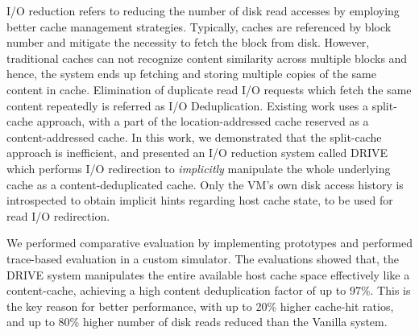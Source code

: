 
I/O reduction refers to reducing the number of disk read accesses by
employing better cache management strategies. Typically, caches are 
referenced by block number and mitigate the necessity to fetch the block
from disk. However, traditional caches can not recognize content similarity
across multiple blocks and hence, the system ends up fetching and storing 
multiple copies of the same content in cache.
Elimination of duplicate read I/O requests which fetch the same 
content repeatedly is referred as I/O Deduplication.
Existing work uses a split-cache approach, with a part of the location-addressed
cache reserved as a content-addressed cache. In this work, we demonstrated
that the split-cache approach is inefficient, and presented an
I/O reduction system called DRIVE which performs I/O 
redirection to \textit{implicitly} manipulate the whole underlying cache as 
a content-deduplicated cache. Only the VM's own disk access history is
introspected to obtain implicit hints regarding host cache state, to be used
for read I/O redirection.

We performed comparative evaluation by implementing 
prototypes and performed trace-based evaluation in a custom simulator. 
The evaluations showed that, 
the DRIVE system
manipulates the entire available host cache space effectively like
a content-cache, achieving a high content deduplication factor of up to 97\%.
This is the key reason for better performance, with
up to 20\% higher cache-hit ratios,
and up to 80\% higher number of disk reads reduced than the Vanilla system.
